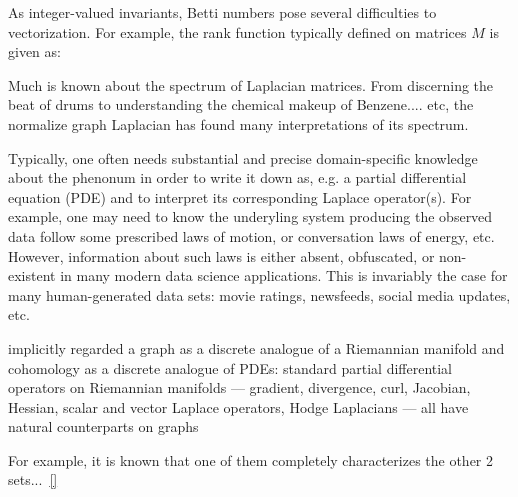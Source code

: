 As integer-valued invariants, Betti numbers pose several difficulties to vectorization. For example, the rank function typically defined on matrices $M$ is given as: 

Much is known about the spectrum of Laplacian matrices. From discerning the beat of drums to understanding the chemical makeup of Benzene.... etc, the normalize graph Laplacian has found many interpretations of its spectrum. 

Typically, one often needs substantial and precise domain-specific knowledge about the phenonum in order to write it down as, e.g. a partial differential equation (PDE) and to interpret its corresponding Laplace operator(s). For example, one may need to know the underyling system producing the observed data follow some prescribed laws of motion, or conversation laws of energy, etc.
However, information about such laws is either absent, obfuscated, or non-existent in many modern data science applications. This is invariably the case for many human-generated data sets: movie ratings, newsfeeds, social media updates, etc.
 
 implicitly regarded a graph as a discrete analogue of a
Riemannian manifold and cohomology as a discrete analogue of PDEs: standard
partial differential operators on Riemannian manifolds — gradient, divergence, curl,
Jacobian, Hessian, scalar and vector Laplace operators, Hodge Laplacians — all have
natural counterparts on graphs
 

For example, it is known that one of them completely characterizes the other 2 sets...~\eqref{} 

